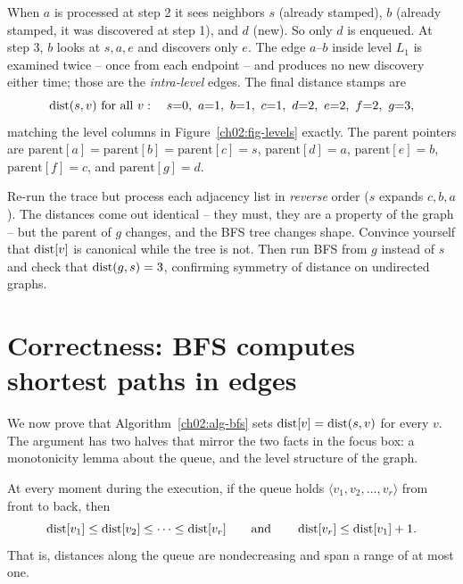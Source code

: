 When $a$ is processed at step 2 it sees neighbors $s$ (already stamped), $b$
(already stamped, it was discovered at step 1), and $d$ (new). So only $d$ is
enqueued. At step 3, $b$ looks at $s,a,e$ and discovers only $e$. The edge $a$--$b$
inside level $L_1$ is examined twice -- once from each endpoint -- and produces no
new discovery either time; those are the \emph{intra-level} edges. The final
distance stamps are
\[
  \dist(s,v) \text{ for all } v:\quad s{=}0,\ a{=}1,\ b{=}1,\ c{=}1,\ d{=}2,\ e{=}2,\ f{=}2,\ g{=}3,
\]
matching the level columns in Figure~\ref{ch02:fig-levels} exactly. The parent
pointers are $\mathrm{parent}[a]=\mathrm{parent}[b]=\mathrm{parent}[c]=s$,
$\mathrm{parent}[d]=a$, $\mathrm{parent}[e]=b$, $\mathrm{parent}[f]=c$, and
$\mathrm{parent}[g]=d$.

\begin{labbox}
Re-run the trace but process each adjacency list in \emph{reverse} order
($s$ expands $c,b,a$). The distances come out identical -- they must, they are a
property of the graph -- but the parent of $g$ changes, and the BFS tree changes
shape. Convince yourself that $\operatorname{dist}[v]$ is canonical while the tree is not.
Then run BFS from $g$ instead of $s$ and check that $\operatorname{dist}(g,s)=3$, confirming
symmetry of distance on undirected graphs.
\end{labbox}

\section{Correctness: BFS computes shortest paths in edges}
\label{ch02:correctness}

We now prove that Algorithm~\ref{ch02:alg-bfs} sets $\operatorname{dist}[v]=\operatorname{dist}(s,v)$ for
every $v$. The argument has two halves that mirror the two facts in the focus
box: a monotonicity lemma about the queue, and the level structure of the graph.

\begin{lemma}
\label{ch02:lem-monotone}
At every moment during the execution, if the queue holds
$\langle v_1, v_2, \dots, v_r\rangle$ from front to back, then
\[
  \operatorname{dist}[v_1] \le \operatorname{dist}[v_2] \le \cdots \le \operatorname{dist}[v_r]
  \qquad\text{and}\qquad
  \operatorname{dist}[v_r] \le \operatorname{dist}[v_1] + 1 .
\]
That is, distances along the queue are nondecreasing and span a range of at most
one.
\end{lemma}

